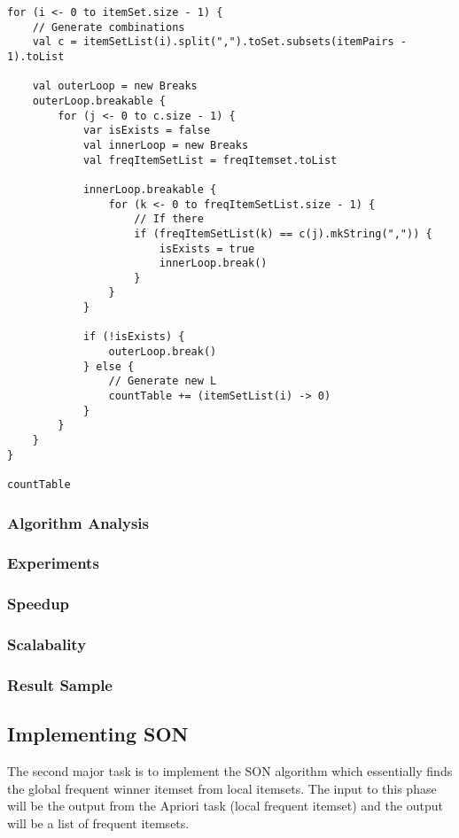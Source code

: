 \documentclass[11pt]{article}
\begin{document}
\begin{lstlisting}
for (i <- 0 to itemSet.size - 1) {
    // Generate combinations
    val c = itemSetList(i).split(",").toSet.subsets(itemPairs - 1).toList

    val outerLoop = new Breaks
    outerLoop.breakable {
        for (j <- 0 to c.size - 1) {
            var isExists = false
            val innerLoop = new Breaks
            val freqItemSetList = freqItemset.toList

            innerLoop.breakable {
                for (k <- 0 to freqItemSetList.size - 1) {
                    // If there
                    if (freqItemSetList(k) == c(j).mkString(",")) {
                        isExists = true
                        innerLoop.break()
                    }
                }
            }

            if (!isExists) {
                outerLoop.break()
            } else {
                // Generate new L
                countTable += (itemSetList(i) -> 0)
            }
        }
    }
}

countTable
\end{lstlisting}


\subsubsection {Algorithm Analysis}
\subsubsection {Experiments}
\subsubsection {Speedup}
\subsubsection {Scalabality}
\subsubsection {Result Sample}
 
\subsection{Implementing SON}

The second major task is to implement the SON algorithm which essentially finds the global frequent winner itemset from local itemsets. The input to this phase will be the output from the Apriori task (local frequent itemset) and the output will be a list of frequent itemsets.\\
\end{document}
